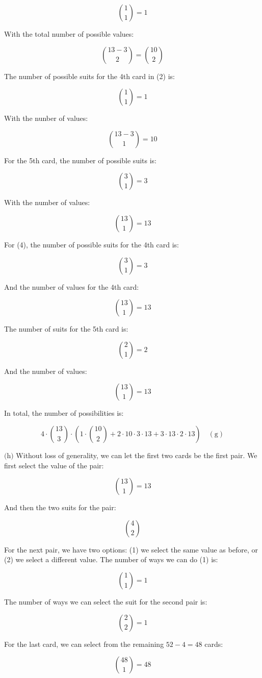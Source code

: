 \documentclass{article}
\newcommand{\subproblem}[1]{$\boxed{\text{(#1)}}$}
\newcommand{\subsolution}[2]{\boxed{#2\quad(\text{#1})}}
\begin{document}
\begin{multicols*}{2}
\[
\binom{1}{1}=1
\]

With the total number of possible values:

\[
\binom{13-3}{2}=\binom{10}{2}
\]

The number of possible suits for the 4th card in (2) is:

\[
\binom{1}{1}=1
\]

With the nunber of values:

\[
\binom{13-3}{1}=10
\]

For the 5th card, the number of possible suits is:

\[
\binom{3}{1}=3
\]

With the number of values:

\[
\binom{13}{1}=13
\]

For (4), the number of possible suits for the 4th card is:

\[
\binom{3}{1}=3
\]

And the number of values for the 4th card:

\[
\binom{13}{1}=13
\]

The number of suits for the 5th card is:

\[
\binom{2}{1}=2
\]

And the number of values:

\[
\binom{13}{1}=13
\]

In total, the number of possibilities is:

\[
\subsolution{g}{4\cdot\binom{13}{3}\cdot\left(1\cdot\binom{10}{2}+2\cdot10\cdot3\cdot13+3\cdot13\cdot2\cdot13\right)}
\]

%
\subproblem{h} Without loss of generality, we can let the first two
cards be the first pair. We first select the value of the pair:

\[
\binom{13}{1}=13
\]

And then the two suits for the pair:

\[
\binom{4}{2}
\]

For the next pair, we have two options: (1) we select the same value
as before, or (2) we select a different value. The number of ways we
can do (1) is:

\[
\binom{1}{1}=1
\]

The number of ways we can select the suit for the second pair is:

\[
\binom{2}{2}=1
\]

For the last card, we can select from the remaining $52-4=48$ cards:

\[
\binom{48}{1}=48
\]


\end{multicols*}
\end{document}

